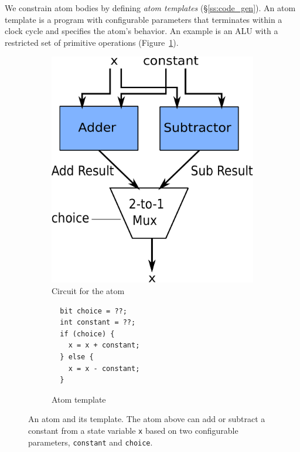 We constrain atom bodies by defining {\it atom templates}
(\S\ref{ss:code_gen}).  An atom template is a program with configurable
parameters that terminates within a clock cycle and specifies the atom's
behavior.  An example is an ALU with a restricted set of primitive operations
(Figure~\ref{fig:alu_diag}).



\begin{figure}[h]
  \begin{subfigure}{0.4\columnwidth}
  \includegraphics[width=\textwidth]{domino_circuit.pdf}
  \caption{Circuit for the atom}
  \label{fig:alu_diag}
  \end{subfigure}
  \hspace{0.05\columnwidth}
  \begin{subfigure}{0.55\columnwidth}
  \begin{lstlisting}
  bit choice = ??;
  int constant = ??;
  if (choice) {
    x = x + constant;
  } else {
    x = x - constant;
  }
  \end{lstlisting}
  \caption{Atom template}
  \label{fig:alu_in_sketch}
  \end{subfigure}
  \caption{An atom and its template. The atom above can add or subtract a constant from a state
  variable {\tt x} based on two configurable parameters, {\tt constant} and {\tt choice}.}
  \label{fig:atom}
\end{figure}

